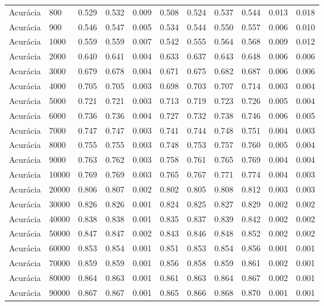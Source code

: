 \begin{table}[htbp]
\begin{table}
\begin{tabular}{ll|rrrrrrrrr}
Acurácia & 800 & 0.529 & 0.532 & 0.009 & 0.508 & 0.524 & 0.537 & 0.544 & 0.013 & 0.018 \\
Acurácia & 900 & 0.546 & 0.547 & 0.005 & 0.534 & 0.544 & 0.550 & 0.557 & 0.006 & 0.010 \\
Acurácia & 1000 & 0.559 & 0.559 & 0.007 & 0.542 & 0.555 & 0.564 & 0.568 & 0.009 & 0.012 \\
Acurácia & 2000 & 0.640 & 0.641 & 0.004 & 0.633 & 0.637 & 0.643 & 0.648 & 0.006 & 0.006 \\
Acurácia & 3000 & 0.679 & 0.678 & 0.004 & 0.671 & 0.675 & 0.682 & 0.687 & 0.006 & 0.006 \\
Acurácia & 4000 & 0.705 & 0.705 & 0.003 & 0.698 & 0.703 & 0.707 & 0.714 & 0.003 & 0.004 \\
Acurácia & 5000 & 0.721 & 0.721 & 0.003 & 0.713 & 0.719 & 0.723 & 0.726 & 0.005 & 0.004 \\
Acurácia & 6000 & 0.736 & 0.736 & 0.004 & 0.727 & 0.732 & 0.738 & 0.746 & 0.006 & 0.005 \\
Acurácia & 7000 & 0.747 & 0.747 & 0.003 & 0.741 & 0.744 & 0.748 & 0.751 & 0.004 & 0.003 \\
Acurácia & 8000 & 0.755 & 0.755 & 0.003 & 0.748 & 0.753 & 0.757 & 0.760 & 0.005 & 0.004 \\
Acurácia & 9000 & 0.763 & 0.762 & 0.003 & 0.758 & 0.761 & 0.765 & 0.769 & 0.004 & 0.004 \\
Acurácia & 10000 & 0.769 & 0.769 & 0.003 & 0.765 & 0.767 & 0.771 & 0.774 & 0.004 & 0.003 \\
Acurácia & 20000 & 0.806 & 0.807 & 0.002 & 0.802 & 0.805 & 0.808 & 0.812 & 0.003 & 0.003 \\
Acurácia & 30000 & 0.826 & 0.826 & 0.001 & 0.824 & 0.825 & 0.827 & 0.829 & 0.002 & 0.002 \\
Acurácia & 40000 & 0.838 & 0.838 & 0.001 & 0.835 & 0.837 & 0.839 & 0.842 & 0.002 & 0.002 \\
Acurácia & 50000 & 0.847 & 0.847 & 0.002 & 0.843 & 0.846 & 0.848 & 0.852 & 0.002 & 0.002 \\
Acurácia & 60000 & 0.853 & 0.854 & 0.001 & 0.851 & 0.853 & 0.854 & 0.856 & 0.001 & 0.001 \\
Acurácia & 70000 & 0.859 & 0.859 & 0.001 & 0.856 & 0.858 & 0.859 & 0.861 & 0.002 & 0.001 \\
Acurácia & 80000 & 0.864 & 0.863 & 0.001 & 0.861 & 0.863 & 0.864 & 0.867 & 0.002 & 0.001 \\
Acurácia & 90000 & 0.867 & 0.867 & 0.001 & 0.865 & 0.866 & 0.868 & 0.870 & 0.001 & 0.001 \\

\end{tabular}
\end{table}
\end{table}
